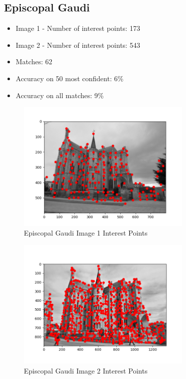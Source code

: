 \documentclass{article}
\begin{document}
\subsection{Episcopal Gaudi}
\begin{itemize}
    \item Image 1 - Number of interest points: 173
    \item Image 2 - Number of interest points: 543
    \item Matches: 62
    \item Accuracy on 50 most confident: 6\%
    \item Accuracy on all matches: 9\%
\end{itemize}

\begin{figure}[H] %
    \centering
    \includegraphics[width=0.75\textwidth]{images/episcopal_gaudi_figure_1_points.png} %
    \caption{Episcopal Gaudi Image 1 Interest Points}
    \label{fig:e_gaudi_1}
\end{figure}
\begin{figure}[H]
    \centering
    \includegraphics[width=0.75\textwidth]{images/episcopal_gaudi_figure_2_points.png} %
    \caption{Episcopal Gaudi Image 2 Interest Points}
    \label{fig:e_gaudi_2}
\end{figure}
\end{document}
